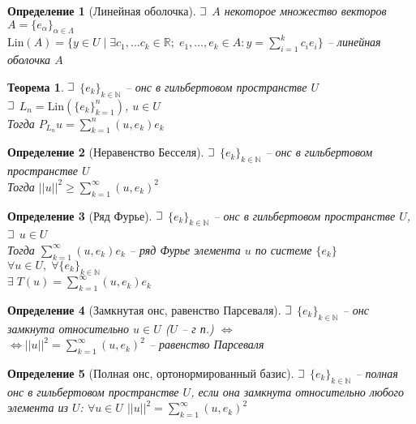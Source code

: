 \documentclass{article}
\theoremstyle{truestyle}
\newtheorem*{defenition}{Определение}
\newtheorem*{theorem}{Теорема}
\newcommand{\Lin}{\text{Lin}}
\def\letus{%
	\mathord{\setbox0=\hbox{$\exists$}%
		\hbox{\kern 0.125\wd0%
			\vbox to \ht0{%
				\hrule width 0.75\wd0%
				\vfill%
				\hrule width 0.75\wd0}%
			\vrule height \ht0%
			\kern 0.125\wd0}%
	}%
}
\begin{document}
\begin{defenition}[Линейная оболочка]
  $\letus$ $A$ некоторое множество векторов $A = \{e_\alpha\}_{\alpha \in \Lambda}$\\
  $\Lin(A) = \{y \in U \mid \exists c_1, \dots c_k \in \mathbb{R}; \; e_{1}, \dots, e_{k} \in A: 
  y = \sum\limits_{i=1}^{k}c_i e_{i}\}$ -- линейная оболочка $A$
\end{defenition}

\begin{theorem}
  $\letus$ $\{e_k\}_{k \in \mathbb{N}}$ -- онс в гильбертовом пространстве $U$\\
  $\letus$ $L_n = \Lin(\{e_k\}_{k=1}^{n})$, $u \in U$\\
  Тогда $P_{L_n}u = \sum\limits_{k=1}^{n}(u, e_k)e_k$
\end{theorem}

\begin{defenition}[Неравенство Бесселя]
  $\letus$ $\{e_k\}_{k \in \mathbb{N}}$ -- онс в гильбертовом пространстве $U$\\
  Тогда $||u||^2 \ge \sum\limits_{k=1}^{\infty}(u, e_k)^2$
\end{defenition}

\begin{defenition}[Ряд Фурье]
  $\letus$ $\{e_k\}_{k \in \mathbb{N}}$ -- онс в гильбертовом пространстве $U$, $\letus$ $u \in U$\\
  Тогда $\sum\limits_{k=1}^{\infty}(u, e_k)e_k$ -- ряд Фурье элемента $u$ по системе $\{e_k\}$\\
  $\forall u \in U, \; \forall \{e_k\}_{k \in \mathbb{N}}$\\
  $\exists \; T(u) = \sum\limits_{k=1}^{\infty}(u, e_k)e_k$
\end{defenition}

\begin{defenition}[Замкнутая онс, равенство Парсеваля]
  $\letus$ $\{e_k\}_{k \in \mathbb{N}}$ -- онс замкнута относительно $u \in U$ ($U$ -- г п.) $\Leftrightarrow$ \\
  $\Leftrightarrow ||u||^2 = \sum\limits_{k=1}^{\infty}(u, e_k)^2$ -- равенство Парсеваля 
\end{defenition}

\begin{defenition}[Полная онс, ортонормированный базис]
  $\letus$ $\{e_k\}_{k \in \mathbb{N}}$ -- полная онс в гильбертовом пространстве $U$, если она замкнута относительно
  любого элемента из $U$: $\forall u \in U$ $||u||^2 = \sum\limits_{k=1}^{\infty}(u, e_k)^2$
\end{defenition}
\end{document}
